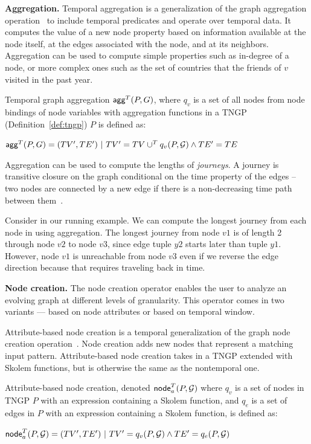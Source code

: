 {\bf Aggregation.}  Temporal aggregation is a generalization of the
graph aggregation operation~\cite{Wood2012} to include temporal
predicates and operate over temporal data.  It computes the value of a
new node property based on information available at the node itself,
at the edges associated with the node, and at its neighbors.
Aggregation can be used to compute simple properties such as in-degree
of a node, or more complex ones such as the set of countries that the
friends of $v$ visited in the past year.

\begin{definition}[Aggregation]
\label{def:tgagg}
Temporal graph aggregation $\textsf{agg}^T(P,G)$, where $q_v$ is a set
of all nodes from node bindings of node variables with aggregation
functions in a TNGP (Definition~\ref{def:tngp}) $P$ is defined as:

$\textsf{agg}^T(P,G) = (TV',TE') ~|~ TV' = TV \cup^T q_v(P,\mathcal{G}) \land TE' = TE$
\end{definition}

Aggregation can be used to compute the lengths of {\em journeys}.  A
journey is transitive closure on the graph conditional on the time
property of the edges -- two nodes are connected by a new edge if
there is a non-decreasing time path between
them~\cite{Casteigts2011,Ferreira2004}.

\begin{example}
Consider \tg \ttt in our running example.  We can compute the longest
journey from each node in \ttt using aggregation.  The longest journey
from node $v1$ is of length 2 through node $v2$ to node $v3$, since
edge tuple $y2$ starts later than tuple $y1$.  However, node $v1$ is
unreachable from node $v3$ even if we reverse the edge direction because
that requires traveling back in time.
\end{example}

{\bf Node creation.}  The node creation operator enables the user to
analyze an evolving graph at different levels of granularity.  This
operator comes in two variants --- based on node attributes or based
on temporal window.

Attribute-based node creation is a temporal generalization of the
graph node creation operation~\cite{Wood2012}.  Node creation adds new
nodes that represent a matching input pattern.  Attribute-based node
creation takes in a TNGP extended with Skolem functions, but is
otherwise the same as the nontemporal one.

\begin{definition}
\label{def:nodecra}
Attribute-based node creation, denoted $\textsf{node}^T_a(P,\mathcal{G})$
where $q_v$ is a set of nodes in TNGP $P$ with an expression containing a
Skolem function, and $q_e$ is a set of edges in $P$ with an expression
containing a Skolem function, is defined as:

$\textsf{node}^T_a(P,\mathcal{G}) = (TV',TE') ~|~ TV' = q_v(P,\mathcal{G}) \land TE' = q_e(P,\mathcal{G})$
\end{definition}

